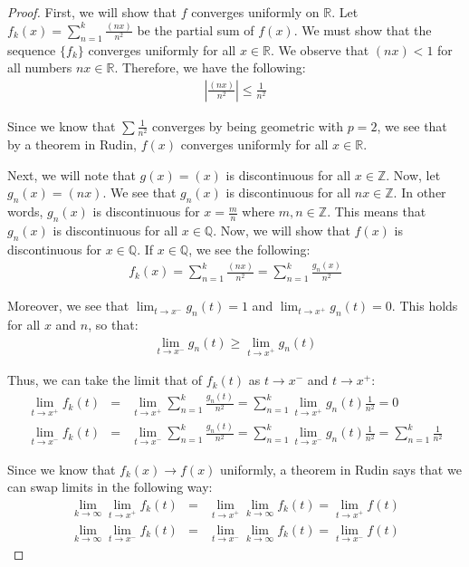 \documentclass[psamsfonts]{amsart}
\theoremstyle{definition}
\theoremstyle{remark}
\numberwithin{equation}{section}
\begin{document}
\begin{proof}
First, we will show that $f$ converges uniformly on $\mathbb{R}$. Let $f_k(x) = \sum_{n=1}^k \frac{(nx)}{n^2}$ be the partial sum of $f(x)$. We must show that the sequence $\{f_k \}$ converges uniformly for all $x \in \mathbb{R}$. We observe that $(nx) < 1$ for all numbers $nx \in \mathbb{R}$. Therefore, we have the following:
\begin{eqnarray}
\left| \frac{(nx)}{n^2} \right| \leq \frac{1}{n^2}
\end{eqnarray}

Since we know that $\sum \frac{1}{n^2}$ converges by being geometric with $p = 2$, we see that by a theorem in Rudin, $f(x)$ converges uniformly for all $x \in \mathbb{R}$. 

Next, we will note that $g(x) = (x)$ is discontinuous for all $x \in \mathbb{Z}$. Now, let $g_n(x) = (nx)$. We see that $g_n(x)$ is discontinuous for all $nx \in \mathbb{Z}$. In other words, $g_n(x)$ is discontinuous for $x = \frac{m}{n}$ where $m,n \in \mathbb{Z}$. This means that $g_n(x)$ is discontinuous for all $x \in \mathbb{Q}$. Now, we will show that $f(x)$ is discontinuous for $x \in \mathbb{Q}$. If $x \in \mathbb{Q}$, we see the following:
\begin{eqnarray}
f_k(x) = \sum_{n=1}^k \frac{(nx)}{n^2} = \sum_{n=1}^k \frac{g_n(x)}{n^2}
\end{eqnarray}

Moreover, we see that $\lim_{t \to x^{-}} g_n(t) = 1$ and $\lim_{t \to x^{+}} g_n(t) = 0$. This holds for all $x$ and $n$, so that:
\begin{eqnarray}
\lim_{t \to x^{-}} g_n(t) \geq \lim_{t \to x^{+}} g_n(t)
\end{eqnarray}

Thus, we can take the limit that of $f_k(t)$ as $t \to x^{-}$ and $t \to x^{+}$:
\begin{eqnarray}
\lim_{t \to x^{+}} f_k(t) &=& \lim_{t \to x^{+}} \sum_{n=1}^k \frac{g_n(t)}{n^2} = \sum_{n=1}^k \lim_{t \to x^{+}} g_n(t) \frac{1}{n^2}= 0 \\
\lim_{t \to x^{-}} f_k(t) &=& \lim_{t \to x^{-}} \sum_{n=1}^k \frac{g_n(t)}{n^2} =\sum_{n=1}^k \lim_{t \to x^{-}} g_n(t) \frac{1}{n^2} = \sum_{n=1}^k \frac{1}{n^2}
\end{eqnarray}

Since we know that $f_k(x) \to f(x)$ uniformly, a theorem in Rudin says that we can swap limits in the following way:
\begin{eqnarray}
\lim_{k \to \infty} \lim_{t \to x^{+}} f_k(t) &=& \lim_{t \to x^{+}} \lim_{k \to \infty} f_k(t) = \lim_{t \to x^{+}} f(t) \\
\lim_{k \to \infty} \lim_{t \to x^{-}} f_k(t) &=& \lim_{t \to x^{-}} \lim_{k \to \infty} f_k(t) = \lim_{t \to x^{-}} f(t)
\end{eqnarray}


\end{proof}
\end{document}
